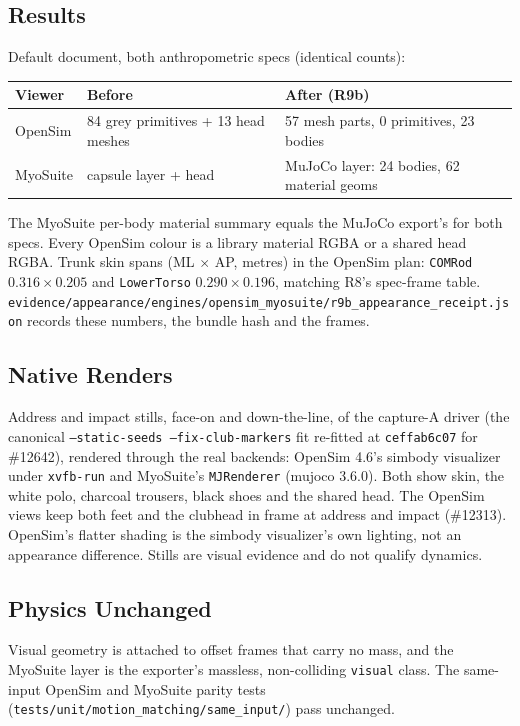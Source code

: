 \subsection{Results}
Default document, both anthropometric specs (identical counts):
\begin{center}
\begin{tabular}{lll}
Viewer & Before & After (R9b) \\ \hline
OpenSim & 84 grey primitives + 13 head meshes & 57 mesh parts, 0 primitives, 23 bodies \\
MyoSuite & capsule layer + head & MuJoCo layer: 24 bodies, 62 material geoms \\
\end{tabular}
\end{center}
The MyoSuite per-body material summary equals the MuJoCo export's for both
specs. Every OpenSim colour is a library material RGBA or a shared head RGBA.
Trunk skin spans (ML $\times$ AP, metres) in the OpenSim plan:
\texttt{COMRod} $0.316\times0.205$ and \texttt{LowerTorso}
$0.290\times0.196$, matching R8's spec-frame table.
\texttt{evidence/appearance/engines/opensim\_myosuite/r9b\_appearance\_receipt.json}
records these numbers, the bundle hash and the frames.

\subsection{Native Renders}
Address and impact stills, face-on and down-the-line, of the capture-A driver
(the canonical \texttt{--static-seeds --fix-club-markers} fit re-fitted at
\texttt{ceffab6c07} for \#12642), rendered through the real backends: OpenSim
4.6's simbody visualizer under \texttt{xvfb-run} and MyoSuite's
\texttt{MJRenderer} (mujoco 3.6.0). Both show skin, the white polo, charcoal
trousers, black shoes and the shared head. The OpenSim views keep both feet and
the clubhead in frame at address and impact (\#12313). OpenSim's flatter
shading is the simbody visualizer's own lighting, not an appearance
difference. Stills are visual evidence and do not qualify dynamics.

\subsection{Physics Unchanged}
Visual geometry is attached to offset frames that carry no mass, and the
MyoSuite layer is the exporter's massless, non-colliding \texttt{visual} class.
The same-input OpenSim and MyoSuite parity tests
(\texttt{tests/unit/motion\_matching/same\_input/}) pass unchanged.


